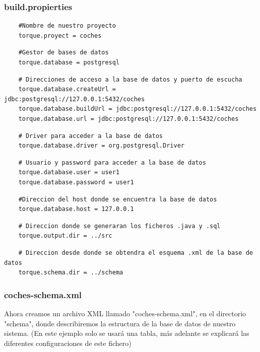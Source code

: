 \documentclass[24pt, a4paper, oneside, spanish]{beamer}
\begin{document}
\begin{frame}
	\frametitle{build.propierties}
	
	\begin{lstlisting}
	#Nombre de nuestro proyecto
	torque.proyect = coches
	\end{lstlisting}
	
	\begin{lstlisting}
	#Gestor de bases de datos
	torque.database = postgresql
	\end{lstlisting}
	
	\begin{lstlisting}
	# Direcciones de acceso a la base de datos y puerto de escucha
	torque.database.createUrl = jdbc:postgresql://127.0.0.1:5432/coches
	torque.database.buildUrl = jdbc:postgresql://127.0.0.1:5432/coches
	torque.database.url = jdbc:postgresql://127.0.0.1:5432/coches	
	\end{lstlisting}
	
	\begin{lstlisting}
	# Driver para acceder a la base de datos
	torque.database.driver = org.postgresql.Driver
	\end{lstlisting}
	
	\begin{lstlisting}
	# Usuario y password para acceder a la base de datos
	torque.database.user = user1
	torque.database.password = user1
	\end{lstlisting}
	
	\begin{lstlisting}
	#Direccion del host donde se encuentra la base de datos
	torque.database.host = 127.0.0.1
	\end{lstlisting}
	
	\begin{lstlisting}
	# Direccion donde se generaran los ficheros .java y .sql
	torque.output.dir = ../src
	\end{lstlisting}
	
	\begin{lstlisting}
	# Direccion desde donde se obtendra el esquema .xml de la base de datos
	torque.schema.dir = ../schema
	\end{lstlisting}
\end{frame}

\begin{frame}
	\frametitle{coches-schema.xml}

Ahora creamos un archivo XML llamado "coches-schema.xml", en el directorio "schema", donde describiremos la estructura de la base de datos de nuestro sistema. (En este ejemplo solo se usará una tabla, más adelante se explicará las diferentes configuraciones de este fichero)

	
\end{frame}
\end{document}
